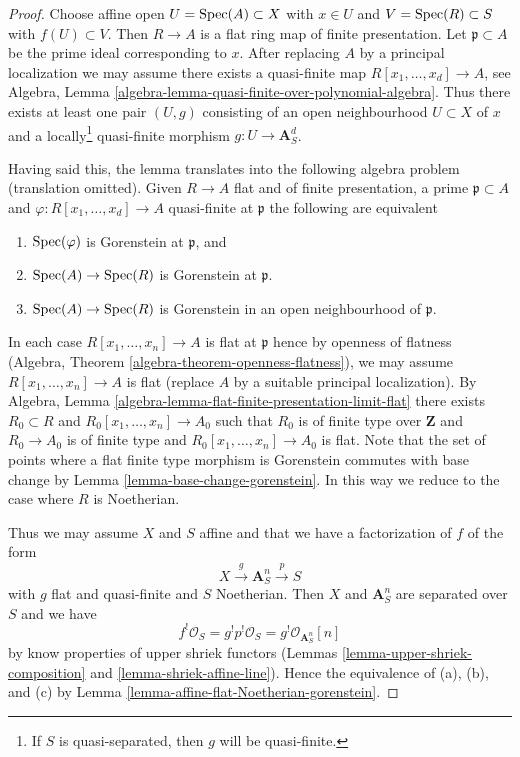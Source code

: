 \begin{proof}
Choose affine open $U = \mathop{\mathrm{Spec}}(A) \subset X$ with $x \in U$ and
$V = \mathop{\mathrm{Spec}}(R) \subset S$ with $f(U) \subset V$. Then $R \to A$
is a flat ring map of finite presentation. Let $\mathfrak p \subset A$
be the prime ideal corresponding to $x$. After replacing $A$ by a
principal localization we may assume there exists a quasi-finite map
$R[x_1, \ldots, x_d]  \to A$, see
Algebra, Lemma \ref{algebra-lemma-quasi-finite-over-polynomial-algebra}.
Thus there exists at least one pair $(U, g)$ consisting of an
open neighbourhood $U \subset X$ of $x$ and a locally\footnote{If $S$
is quasi-separated, then $g$ will be quasi-finite.} quasi-finite morphism
$g : U \to \mathbf{A}^d_S$.

\medskip\noindent
Having said this, the lemma translates into the following algebra
problem (translation omitted). Given $R \to A$ flat and of finite
presentation, a prime $\mathfrak p \subset A$ and
$\varphi : R[x_1, \ldots, x_d] \to A$ quasi-finite at $\mathfrak p$
the following are equivalent
\begin{enumerate}
\item[(a)] $\mathop{\mathrm{Spec}}(\varphi)$ is Gorenstein at $\mathfrak p$, and
\item[(b)] $\mathop{\mathrm{Spec}}(A) \to \mathop{\mathrm{Spec}}(R)$ is Gorenstein at $\mathfrak p$.
\item[(c)] $\mathop{\mathrm{Spec}}(A) \to \mathop{\mathrm{Spec}}(R)$ is Gorenstein in an open neighbourhood
of $\mathfrak p$.
\end{enumerate}
In each case $R[x_1, \ldots, x_n] \to A$ is flat at $\mathfrak p$
hence by openness of flatness
(Algebra, Theorem \ref{algebra-theorem-openness-flatness}),
we may assume $R[x_1, \ldots, x_n] \to A$
is flat (replace $A$ by a suitable principal localization).
By Algebra, Lemma \ref{algebra-lemma-flat-finite-presentation-limit-flat}
there exists $R_0 \subset R$ and $R_0[x_1, \ldots, x_n] \to A_0$
such that $R_0$ is of finite type over $\mathbf{Z}$ and
$R_0 \to A_0$ is of finite type and $R_0[x_1, \ldots, x_n] \to A_0$ is flat.
Note that the set of points where a flat finite type morphism
is Gorenstein commutes with base change by
Lemma \ref{lemma-base-change-gorenstein}.
In this way we reduce to the case where $R$ is Noetherian.

\medskip\noindent
Thus we may assume $X$ and $S$ affine and that
we have a factorization of $f$ of the form
$$
X \xrightarrow{g} \mathbf{A}^n_S \xrightarrow{p} S
$$
with $g$ flat and quasi-finite and $S$ Noetherian. Then $X$ and
$\mathbf{A}^n_S$ are separated over $S$ and we have
$$
f^!\mathcal{O}_S = g^!p^!\mathcal{O}_S = g^!\mathcal{O}_{\mathbf{A}^n_S}[n]
$$
by know properties of upper shriek functors
(Lemmas \ref{lemma-upper-shriek-composition} and
\ref{lemma-shriek-affine-line}).
Hence the equivalence of (a), (b), and (c) by
Lemma \ref{lemma-affine-flat-Noetherian-gorenstein}.
\end{proof}

